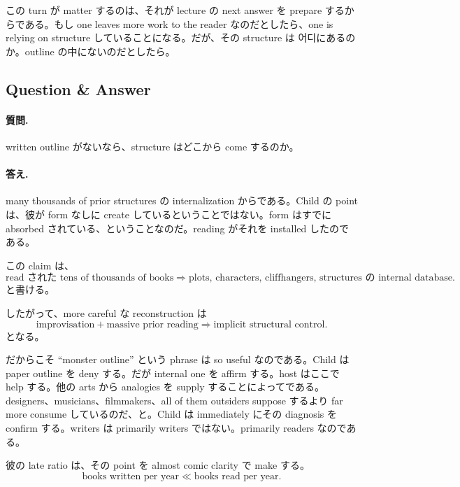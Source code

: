 この turn が matter するのは、それが lecture の next answer を prepare するからである。もし one leaves more work to the reader なのだとしたら、one is relying on structure していることになる。だが、その structure は 어디にあるのか。outline の中にないのだとしたら。

\subsection{Question \& Answer}

\paragraph{質問.} written outline がないなら、structure はどこから come するのか。

\paragraph{答え.} many thousands of prior structures の internalization からである。Child の point は、彼が form なしに create しているということではない。form はすでに absorbed されている、ということなのだ。reading がそれを installed したのである。

この claim は、
\begin{equation}
\text{read された tens of thousands of books} \Longrightarrow \text{plots, characters, cliffhangers, structures の internal database}.
\end{equation}
と書ける。

したがって、more careful な reconstruction は
\begin{equation}
\text{improvisation} + \text{massive prior reading} \Longrightarrow \text{implicit structural control}.
\end{equation}
となる。

だからこそ ``monster outline'' という phrase は so useful なのである。Child は paper outline を deny する。だが internal one を affirm する。host はここで help する。他の arts から analogies を supply することによってである。designers、musicians、filmmakers、all of them outsiders suppose するより far more consume しているのだ、と。Child は immediately にその diagnosis を confirm する。writers は primarily writers ではない。primarily readers なのである。

彼の late ratio は、その point を almost comic clarity で make する。
\begin{equation}
\text{books written per year} \ll \text{books read per year}.
\end{equation}

